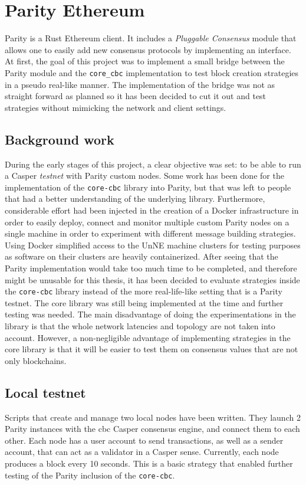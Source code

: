\section{Parity Ethereum}
Parity is a Rust Ethereum client. It includes a \textit{Pluggable Consensus}
module that allows one to easily add new consensus protocols by implementing an
interface.  At first, the goal of this project was to implement a small bridge
between the Parity module and the \texttt{core\_cbc} implementation to test block creation
strategies in a pseudo real-like manner. The implementation of the bridge was
not as straight forward as planned so it has been decided to cut it out and test
strategies without mimicking the network and client settings.

\subsection{Background work}
During the early stages of this project, a clear objective was set: to be able
to run a Casper \textit{testnet} with Parity custom nodes. Some work has been
done for the implementation of the \texttt{core-cbc} library into Parity, but
that was left to people that had a better understanding of the underlying
library. Furthermore, considerable effort had been injected in the creation of a
Docker infrastructure in order to easily deploy, connect and monitor multiple
custom Parity nodes on a single machine in order to experiment with different
message building strategies. Using Docker simplified access to the UnNE machine
clusters for testing purposes as software on their clusters are heavily
containerized. After seeing that the Parity implementation would take too much
time to be completed, and therefore might be unusable for this thesis, it has
been decided to evaluate strategies inside the \texttt{core-cbc} library instead
of the more real-life-like setting that is a Parity testnet. The core library
was still being implemented at the time and further testing was needed.  The
main disadvantage of doing the experimentations in the library is that the whole
network latencies and topology are not taken into account. However, a
non-negligible advantage of implementing strategies in the core library is that
it will be easier to test them on consensus values that are not only
blockchains.

\subsection{Local testnet}
Scripts that create and manage two local nodes have been written. They launch 2
Parity instances with the \gls{cbc} Casper consensus engine, and connect them
to each other. Each node has a user account to send transactions, as well as a
sender account, that can act as a validator in a Casper sense. Currently, each
node produces a block every 10 seconds. This is a basic strategy that enabled
further testing of the Parity inclusion of the \texttt{core-cbc}.

